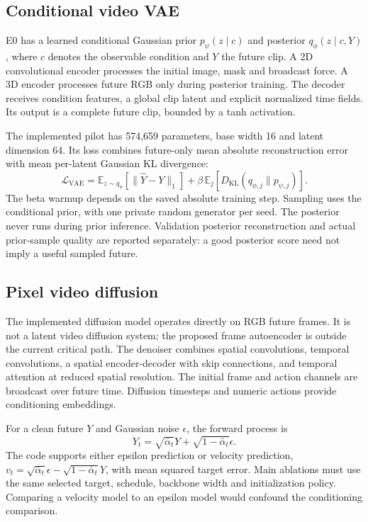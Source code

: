\documentclass[11pt,a4paper]{article}
\begin{document}
\subsection{Conditional video VAE}
E0 has a learned conditional Gaussian prior $p_\psi(z\mid c)$ and posterior $q_\phi(z\mid c,Y)$, where $c$ denotes the observable condition and $Y$ the future clip. A 2D convolutional encoder processes the initial image, mask and broadcast force. A 3D encoder processes future RGB only during posterior training. The decoder receives condition features, a global clip latent and explicit normalized time fields. Its output is a complete future clip, bounded by a tanh activation.

The implemented pilot has 574,659 parameters, base width 16 and latent dimension 64. Its loss combines future-only mean absolute reconstruction error with mean per-latent Gaussian KL divergence:
\[
 \mathcal L_{\mathrm{VAE}}=\mathbb E_{z\sim q_\phi}\!\left[\|\hat Y-Y\|_1\right]
 +\beta\,\mathbb E_{j}\!\left[D_{\mathrm{KL}}(q_{\phi,j}\|p_{\psi,j})\right].
\]
The beta warmup depends on the saved absolute training step. Sampling uses the conditional prior, with one private random generator per seed. The posterior never runs during prior inference. Validation posterior reconstruction and actual prior-sample quality are reported separately: a good posterior score need not imply a useful sampled future.

\subsection{Pixel video diffusion}
The implemented diffusion model operates directly on RGB future frames. It is not a latent video diffusion system; the proposed frame autoencoder is outside the current critical path. The denoiser combines spatial convolutions, temporal convolutions, a spatial encoder-decoder with skip connections, and temporal attention at reduced spatial resolution. The initial frame and action channels are broadcast over future time. Diffusion timesteps and numeric actions provide conditioning embeddings.

For a clean future $Y$ and Gaussian noise $\epsilon$, the forward process is
\[
 Y_t=\sqrt{\bar\alpha_t}Y+\sqrt{1-\bar\alpha_t}\epsilon.
\]
The code supports either epsilon prediction or velocity prediction,
$v_t=\sqrt{\bar\alpha_t}\epsilon-\sqrt{1-\bar\alpha_t}Y$, with mean squared target error. Main ablations must use the same selected target, schedule, backbone width and initialization policy. Comparing a velocity model to an epsilon model would confound the conditioning comparison.
\end{document}
